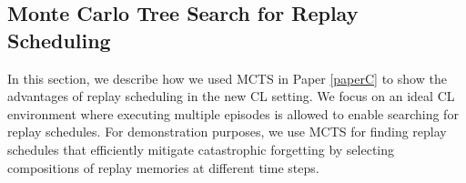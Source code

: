 \subsection{Monte Carlo Tree Search for Replay Scheduling}

In this section, we describe how we used MCTS in Paper \ref{paperC} to show the advantages of replay scheduling in the new CL setting. We focus on an ideal CL environment where executing multiple episodes is allowed to enable searching for replay schedules. For demonstration purposes, we use MCTS for finding replay schedules that efficiently mitigate catastrophic forgetting by selecting compositions of replay memories at different time steps. 

